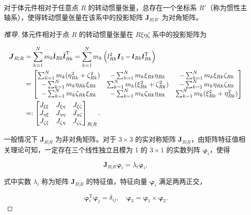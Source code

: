 \begin{theorem}[定理 8.7（惯性主轴系的存在性）]
对于体元件相对于任意点 $R$ 的转动惯量张量，总存在一个坐标系 $R'$（称为惯性主轴系），使得转动惯量张量在该系中的投影矩阵 $\boldsymbol{J}_{R|R'}$ 为对角矩阵。
\end{theorem}
\begin{proof}[推导]
体元件相对于点 $R$ 的转动惯量张量在 $R\xi\eta\zeta$ 系中的投影矩阵为

\begin{align*}\boldsymbol{J}_{R|R} &= \sum_{k=1}^{N} m_k \tilde{\boldsymbol{l}}_{Rk} \tilde{\boldsymbol{l}}_{Rk}^{\mathrm{T}} = \sum_{k=1}^{N} m_k \left( l_{Rk}^2 \boldsymbol{I}_3 - \boldsymbol{l}_{Rk} \boldsymbol{l}_{Rk}^{\mathrm{T}} \right) \notag \\
&= \begin{bmatrix} \sum_{k=1}^{N} m_k (\eta_{Rk}^2 + \zeta_{Rk}^2) & -\sum_{k=1}^{N} m_k \xi_{Rk} \eta_{Rk} & -\sum_{k=1}^{N} m_k \xi_{Rk} \zeta_{Rk} \\ -\sum_{k=1}^{N} m_k \eta_{Rk} \xi_{Rk} & \sum_{k=1}^{N} m_k (\xi_{Rk}^2 + \zeta_{Rk}^2) & -\sum_{k=1}^{N} m_k \eta_{Rk} \zeta_{Rk} \\ -\sum_{k=1}^{N} m_k \zeta_{Rk} \xi_{Rk} & -\sum_{k=1}^{N} m_k \zeta_{Rk} \eta_{Rk} & \sum_{k=1}^{N} m_k (\xi_{Rk}^2 + \eta_{Rk}^2) \end{bmatrix} \notag \\
&=: \begin{bmatrix} J_{\xi\xi} & J_{\xi\eta} & J_{\xi\zeta} \\ J_{\eta\xi} & J_{\eta\eta} & J_{\eta\zeta} \\ J_{\zeta\xi} & J_{\zeta\eta} & J_{\zeta\zeta} \end{bmatrix}_{R|R}.\end{align*}

一般情况下 $\boldsymbol{J}_{R|R}$ 为非对角矩阵。对于 $3 \times 3$ 的实对称矩阵 $\boldsymbol{J}_{R|R}$，由矩阵特征值相关理论可知，一定存在三个线性独立且模为 1 的 $3 \times 1$ 的实数列阵 $\boldsymbol{\varphi}_i$，使得

\begin{equation*}
\boldsymbol{J}_{R|R} \boldsymbol{\varphi}_i = \lambda_i \boldsymbol{\varphi}_i, \tag{I}
\end{equation*}

式中实数 $\lambda_i$ 称为矩阵 $\boldsymbol{J}_{R|R}$ 的特征值，特征向量 $\boldsymbol{\varphi}_i$ 满足两两正交，

\[
\boldsymbol{\varphi}_i^{\mathrm{T}} \boldsymbol{\varphi}_j = \delta_{ij}, \quad \boldsymbol{\varphi}_3 = \boldsymbol{\varphi}_1 \times \boldsymbol{\varphi}_2.
\]


\end{proof}
